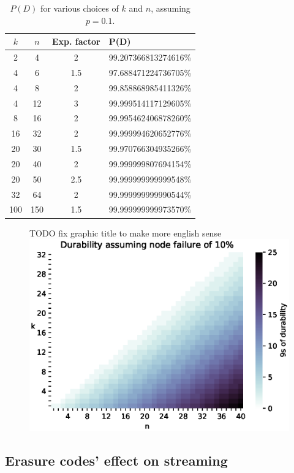 \documentclass[11pt,fleqn,openany]{book}
\newcommand{\todo}[1]{{\color{red} TODO #1 }}
\begin{document}
{\begin{table}[h]
\centering
\begin{tabular}{c c c l}
$k$ & $n$ & Exp. factor & P(D) \\
\hline 2 & 4 & 2 & 99.207366813274616\%\\
4 & 6 & 1.5 & 97.688471224736705\%\\
4 & 8 & 2 & 99.858868985411326\%\\
4 & 12 & 3 & 99.999514117129605\%\\
8 & 16 & 2 & 99.995462406878260\%\\
16 & 32 & 2 & 99.999994620652776\%\\
20 & 30 & 1.5 & 99.970766304935266\%\\
20 & 40 & 2 & 99.999999807694154\%\\
20 & 50 & 2.5 & 99.999999999999548\%\\
32 & 64 & 2 & 99.999999999990544\%\\
100 & 150 & 1.5 & 99.999999999973570\%\\
\end{tabular}
\caption{$P(D)$ for various choices of $k$ and $n$, assuming $p=0.1$.}
\end{table}

\begin{figure} \centering
\todo{fix graphic title to make more english sense}
\includegraphics[width=\linewidth]{durability/durability.eps}
\label{fig:durability}
\end{figure}

}

\subsection{Erasure codes' effect on streaming}
\end{document}

